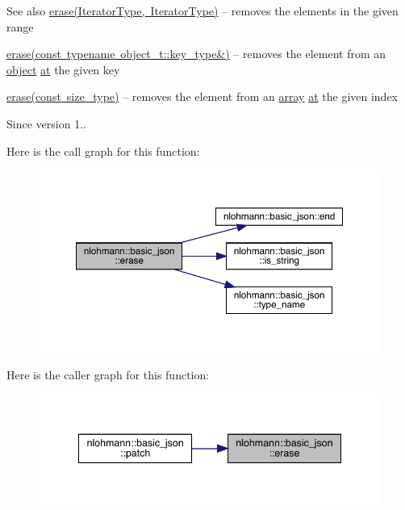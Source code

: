 \begin{DoxySeeAlso}{See also}
\mbox{\hyperlink{classnlohmann_1_1basic__json_a4b3f7eb2d4625d95a51fbbdceb7c5f39}{erase(\+Iterator\+Type, Iterator\+Type)}} -- removes the elements in the given range 

\mbox{\hyperlink{classnlohmann_1_1basic__json_a2f8484d69c55d8f2a9697a7bec29362a}{erase(const typename object\+\_\+t\+::key\+\_\+type\&)}} -- removes the element from an \mbox{\hyperlink{classnlohmann_1_1basic__json_a9f42ee7d10eee2d5a73fd94ca7f767ca}{object}} \mbox{\hyperlink{classnlohmann_1_1basic__json_a73ae333487310e3302135189ce8ff5d8}{at}} the given key 

\mbox{\hyperlink{classnlohmann_1_1basic__json_a88cbcefe9a3f4d294bed0653550a5cb9}{erase(const size\+\_\+type)}} -- removes the element from an \mbox{\hyperlink{classnlohmann_1_1basic__json_a4a4ec75e4d2845d9bcf7a9e5458e4949}{array}} \mbox{\hyperlink{classnlohmann_1_1basic__json_a73ae333487310e3302135189ce8ff5d8}{at}} the given index
\end{DoxySeeAlso}
\begin{DoxySince}{Since}
version 1.. 
\end{DoxySince}
Here is the call graph for this function\+:
\nopagebreak
\begin{figure}[H]
\begin{center}
\leavevmode
\includegraphics[width=350pt]{classnlohmann_1_1basic__json_a068a16e76be178e83da6a192916923ed_cgraph}
\end{center}
\end{figure}
Here is the caller graph for this function\+:
\nopagebreak
\begin{figure}[H]
\begin{center}
\leavevmode
\includegraphics[width=341pt]{classnlohmann_1_1basic__json_a068a16e76be178e83da6a192916923ed_icgraph}
\end{center}
\end{figure}
